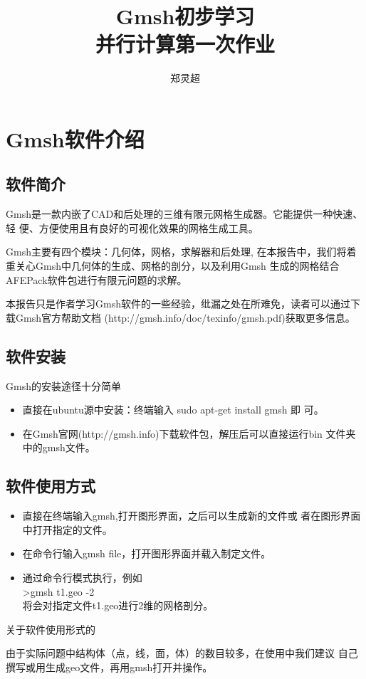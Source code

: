\documentclass[a4paper,  11pt]{ctexart}
\begin{document}
\title{Gmsh初步学习 \\ 并行计算第一次作业}
\author{郑灵超}
\maketitle
\tableofcontents
\newpage
\section{Gmsh软件介绍}
\subsection{软件简介}
Gmsh是一款内嵌了CAD和后处理的三维有限元网格生成器。它能提供一种快速、轻
便、方便使用且有良好的可视化效果的网格生成工具。 

Gmsh主要有四个模块：几何体，网格，求解器和后处理,
在本报告中，我们将着重关心Gmsh中几何体的生成、网格的剖分，以及利用Gmsh
生成的网格结合AFEPack软件包进行有限元问题的求解。

本报告只是作者学习Gmsh软件的一些经验，纰漏之处在所难免，读者可以通过下
载Gmsh官方帮助文档
(http://gmsh.info/doc/texinfo/gmsh.pdf)获取更多信息。
\subsection{软件安装}
Gmsh的安装途径十分简单
\begin{itemize}
	\item 直接在ubuntu源中安装：终端输入 sudo apt-get install gmsh 即
		可。
	\item 在Gmsh官网(http://gmsh.info)下载软件包，解压后可以直接运行bin
	文件夹中的gmsh文件。
\end{itemize}
\subsection{软件使用方式}
\begin{itemize}
		\item 直接在终端输入gmsh,打开图形界面，之后可以生成新的文件或
			者在图形界面中打开指定的文件。
		\item 在命令行输入gmsh file，打开图形界面并载入制定文件。
		\item 通过命令行模式执行，例如\\
			 >gmsh t1.geo -2 \\
			 将会对指定文件t1.geo进行2维的网格剖分。
\end{itemize}
\par
关于软件使用形式的
\par
由于实际问题中结构体（点，线，面，体）的数目较多，在使用中我们建议
自己撰写或用生成geo文件，再用gmsh打开并操作。 
\end{document}
